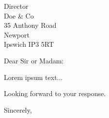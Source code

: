 \documentclass[10pt]{letter}
\begin{document}
\begin{letter}{Director \\
    Doe \& Co \\
    35 Anthony Road \\
    Newport \\
    Ipswich IP3 5RT
}

\opening{Dear Sir or Madam:}

Lorem ipsum text...

Looking forward to your response.

\closing{Sincerely,}


\end{letter}
\end{document}
